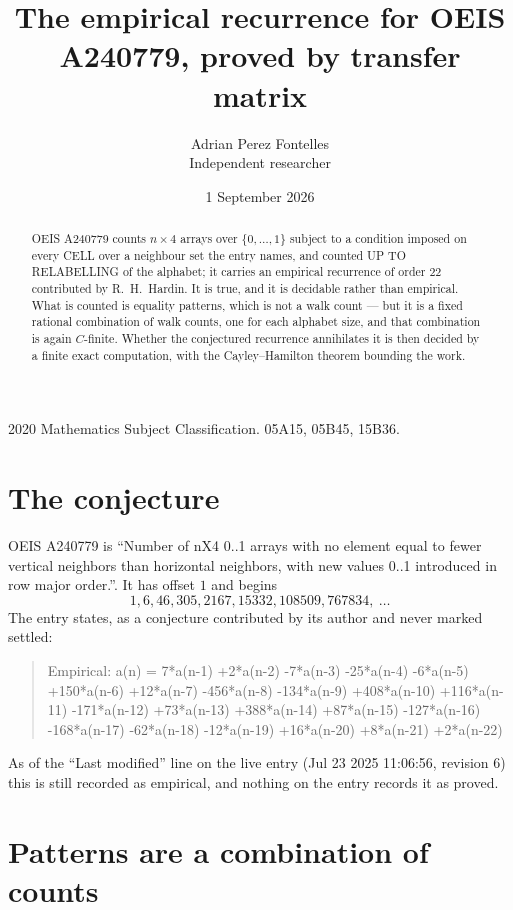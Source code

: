 \documentclass[11pt,a4paper]{article}
\title{The empirical recurrence for OEIS A240779, proved by transfer matrix}
\author{Adrian Perez Fontelles\\ \small Independent researcher}
\date{1 September 2026}
\theoremstyle{plain}
\theoremstyle{definition}
\begin{document}
\maketitle

\begin{abstract}
OEIS A240779 counts $n\times4$ arrays over $\{0,\dots,1\}$ subject to a condition imposed on
every CELL over a neighbour set the entry names, and counted UP TO RELABELLING of the
alphabet; it carries an empirical recurrence of order $22$ contributed by
R.~H.~Hardin. It is true, and it is decidable rather than empirical. What is counted is
equality patterns, which is not a walk count --- but it is a fixed rational combination of
walk counts, one for each alphabet size, and that combination is again $C$-finite. Whether the
conjectured recurrence annihilates it is then decided by a finite exact computation, with the
Cayley--Hamilton theorem bounding the work.
\end{abstract}

\noindent\small 2020 Mathematics Subject Classification. 05A15, 05B45, 15B36.\normalsize

\section{The conjecture}

OEIS A240779 is ``Number of nX4 0..1 arrays with no element equal to fewer vertical neighbors than horizontal neighbors, with new values 0..1 introduced in row major order.''. It has offset $1$ and begins
\[
1, 6, 46, 305, 2167, 15332, 108509, 767834,\ \dots
\]
The entry states, as a conjecture contributed by its author and never marked settled:
\begin{quote}
Empirical: a(n) = 7*a(n-1) +2*a(n-2) -7*a(n-3) -25*a(n-4) -6*a(n-5) +150*a(n-6) +12*a(n-7) -456*a(n-8) -134*a(n-9) +408*a(n-10) +116*a(n-11) -171*a(n-12) +73*a(n-13) +388*a(n-14) +87*a(n-15) -127*a(n-16) -168*a(n-17) -62*a(n-18) -12*a(n-19) +16*a(n-20) +8*a(n-21) +2*a(n-22)
\end{quote}
As of the ``Last modified'' line on the live entry (Jul 23 2025 11:06:56, revision 6) this is still
recorded as empirical, and nothing on the entry records it as proved.

\section{Patterns are a combination of counts}
\end{document}
